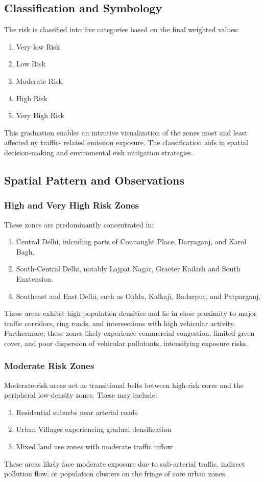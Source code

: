 \documentclass[12pt]{report}
\begin{document}
\subsection{Classification and Symbology}
The risk is classified into five categories based on the final weighted values:
\begin{enumerate}
    \item Very low Risk
    \item Low Risk
    \item Moderate Risk
    \item High Risk
    \item Very High Risk
\end{enumerate}
This graduation enables an intrutive visualization of the zones most and least affected ny traffic- related emission exposure. The classification aids in spatial decision-making and enviromental eisk mitigation strategies.

\subsection{Spatial Pattern and Observations}
\subsubsection{High and Very High Risk Zones}
These zones are predominantly concentrated in:
\begin{enumerate}
    \item Central Delhi, inlcuding parts of Connaught Place, Daryaganj, and Karol Bagh.
    \item South-Central Delhi, notably Lajpat Nagar, Graeter Kailash and South Enxtension.
    \item Southeast and East Delhi, such as Okhla, Kalkaji, Badarpur, and Patparganj.
\end{enumerate}
These areas exhibit high population densities and lie in close proximity to major traffic corridors, ring roads, and intersections with high vehicular activity. Furthermore, these zones likely experience commercial congestion, limited green cover, and poor dispersion of vehicular pollutants, intensifying exposure risks.

\subsubsection{Moderate Risk Zones}
Moderate-risk areas act as transitional belts between high-risk cores and the peripheral low-density zones. These may include:
\begin{enumerate}
    \item Residential suburbs near arterial roads
    \item Urban Villages experiencing gradual densification
    \item Mixed land use zones with moderate traffic inflow
\end{enumerate}
These areas likely face moderate exposure due to sub-arterial traffic, indirect pollution flow, or population clusters on the fringe of core urban zones.
\end{document}
